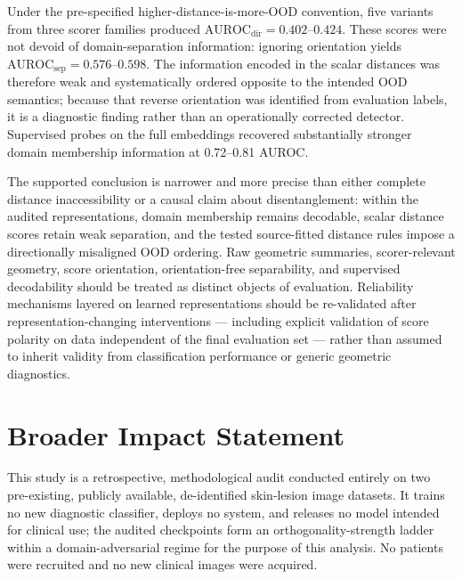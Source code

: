 Under the pre-specified higher-distance-is-more-OOD convention, five variants from three scorer families produced $\mathrm{AUROC}_{\mathrm{dir}}=0.402$--$0.424$. These scores were not devoid of domain-separation information: ignoring orientation yields $\mathrm{AUROC}_{\mathrm{sep}}=0.576$--$0.598$. The information encoded in the scalar distances was therefore weak and systematically ordered opposite to the intended OOD semantics; because that reverse orientation was identified from evaluation labels, it is a diagnostic finding rather than an operationally corrected detector. Supervised probes on the full embeddings recovered substantially stronger domain membership information at 0.72--0.81 AUROC.

The supported conclusion is narrower and more precise than either complete distance inaccessibility or a causal claim about disentanglement: within the audited representations, domain membership remains decodable, scalar distance scores retain weak separation, and the tested source-fitted distance rules impose a directionally misaligned OOD ordering. Raw geometric summaries, scorer-relevant geometry, score orientation, orientation-free separability, and supervised decodability should be treated as distinct objects of evaluation. Reliability mechanisms layered on learned representations should be re-validated after representation-changing interventions --- including explicit validation of score polarity on data independent of the final evaluation set --- rather than assumed to inherit validity from classification performance or generic geometric diagnostics.

\section*{Broader Impact Statement}
\label{sec:broader-impact}

This study is a retrospective, methodological audit conducted entirely on two pre-existing, publicly available, de-identified skin-lesion image datasets. It trains no new diagnostic classifier, deploys no system, and releases no model intended for clinical use; the audited checkpoints form an orthogonality-strength ladder within a domain-adversarial regime for the purpose of this analysis. No patients were recruited and no new clinical images were acquired.

